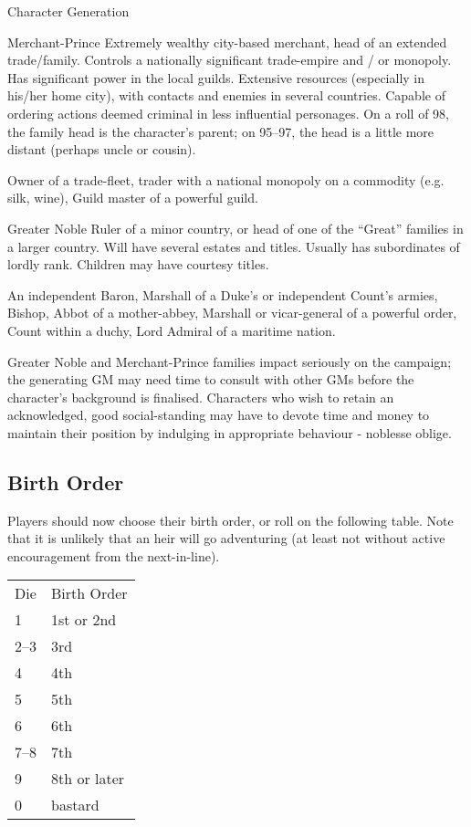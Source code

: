 \begin{Chapter}{Character Generation}
\begin{Description}
\item[Merchant-Prince] Extremely wealthy city-based merchant, head of
  an extended trade/family.  Controls a nationally significant
  trade-empire and / or monopoly.  Has significant power in the local
  guilds.  Extensive resources (especially in his/her home city), with
  contacts and enemies in several countries.  Capable of ordering
  actions deemed criminal in less influential personages. On a roll of
  98, the family head is the character’s parent; on 95–97, the head is
  a little more distant (perhaps uncle or cousin).

  \begin{example}
    Owner of a trade-fleet, trader with a national monopoly on a
    commodity (e.g.  silk, wine), Guild master of a powerful guild.
  \end{example}

\item[Greater Noble] Ruler of a minor country, or head of one of the
  “Great” families in a larger country.  Will have several estates and
  titles.  Usually has subordinates of lordly rank.  Children may have
  courtesy titles.

  \begin{example}
    An independent Baron, Marshall of a Duke’s or independent Count’s
    armies, Bishop, Abbot of a mother-abbey, Marshall or vicar-general
    of a powerful order, Count within a duchy, Lord Admiral of a
    maritime nation.
  \end{example}

\end{Description}

Greater Noble and Merchant-Prince families impact seriously on the
campaign; the generating GM may need time to consult with other GMs
before the character’s background is finalised. Characters who wish to
retain an acknowledged, good social-standing may have to devote time
and money to maintain their position by indulging in appropriate
behaviour - noblesse oblige.

\subsection{Birth Order}

Players should now choose their birth order, or roll on the following
table. Note that it is unlikely that an heir will go adventuring (at
least not without active encouragement from the next-in-line).

\begin{tabularx}{\columnwidth}{ll}
Die	& Birth Order \\
1	& 1st or 2nd \\  
2–3	& 3rd \\
4	& 4th \\
5	& 5th \\
6	& 6th \\  
7–8	& 7th \\
9	& 8th or later \\
0	& bastard \\
\end{tabularx}


\end{Chapter}
